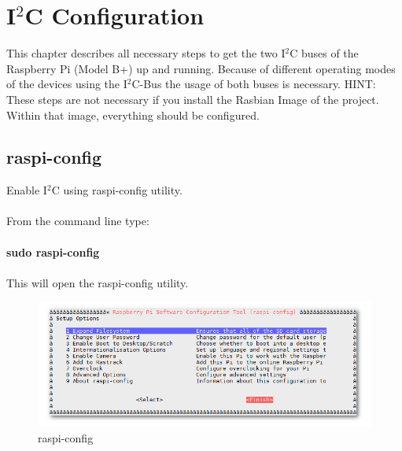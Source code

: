 \chapter{I$^2$C Configuration}
\label{chap:I2C}

This chapter describes all necessary steps to get the two I$^2$C buses of the Raspberry Pi (Model B+) up and running. Because of different operating modes of the devices using the I$^2$C-Bus the usage of both buses is necessary.\newline\newline
HINT: These steps are not necessary if you install the Rasbian Image of the project. Within that image, everything should be configured.


\section{raspi-config}
\label{sec:raspiconfig}
Enable I$^2$C using raspi-config utility.\\\\
From the command line type:\\\\
\ttfamily \textbf{sudo raspi-config}\\\\
\normalfont This will open the raspi-config utility.

\begin{figure}[H]
	\centering\includegraphics[width=\textwidth]{fig/raspi_config}
	\caption{raspi-config}
	\label{fig:raspiconfig}
\end{figure}


